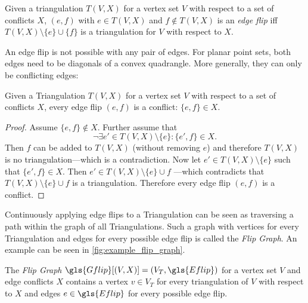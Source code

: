 \begin{definition}
  \label{def:edge_flip}
  Given a triangulation \(T(V,X)\) for a vertex set \(V\) with respect
  to a set of conflicts \(X\), \((e, f)\) with \(e \in T(V,X)\) and
  \(f \not\in T(V,X)\) is an \emph{edge flip} iff
  \(T(V,X) \setminus \{e\} \cup \{f\}\) is a triangulation for \(V\)
  with respect to \(X\).
\end{definition}

An edge flip is not possible with any pair of edges. For planar point
sets, both edges need to be diagonals of a convex quadrangle. More
generally, they can only be conflicting edges:

\begin{theorem}
  Given a Triangulation \(T(V,X)\) for a vertex set \(V\)
  with respect to a set of conflicts \(X\),
  every edge flip \((e,f)\) is a conflict: \(\{e,f\} \in X\).
  \begin{proof}
  Assume \(\{e,f\} \not\in X\). Further assume that
  \[ \lnot\exists e' \in T(V,X)\setminus\{e\}: \{e', f\} \in X. \]
  Then \(f\) can be added to \(T(V,X)\) (without removing \(e\)) and
  therefore \(T(V,X)\) is no triangulation---which is a 
  contradiction. Now let \(e' \in T(V,X)\setminus\{e\}\) such that
  \(\{e', f\} \in X\). Then \(e' \in T(V,X)\setminus\{e\} \cup f\)
  ---which contradicts that \(T(V,X)\setminus\{e\} \cup f\) is a
  triangulation. Therefore every edge flip \((e,f)\) is a conflict.
  \end{proof}
\end{theorem}

Continuously applying edge flips to a Triangulation can be seen as
traversing a path within the graph of all Triangulations. Such a graph
with vertices for every Triangulation and edges for every possible
edge flip is called the \emph{Flip Graph}. An example can be seen in
\cref{fig:example_flip_graph}.

\begin{definition}
  \label{def:flip_graph}
  The \emph{Flip Graph} \(\gls{Gflip}[(V,X)] = (V_T,\gls{Eflip})\)
  for a vertex set \(V\) and edge conflicts \(X\)
  contains a vertex \(v \in V_T\) for every triangulation of \(V\)
  with respect to \(X\) and edges \(e \in \gls{Eflip}\)
  for every possible edge flip.
\end{definition}

